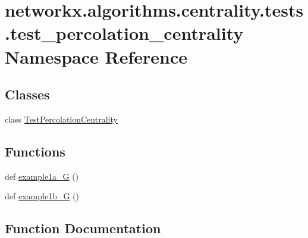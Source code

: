 \hypertarget{namespacenetworkx_1_1algorithms_1_1centrality_1_1tests_1_1test__percolation__centrality}{}\section{networkx.\+algorithms.\+centrality.\+tests.\+test\+\_\+percolation\+\_\+centrality Namespace Reference}
\label{namespacenetworkx_1_1algorithms_1_1centrality_1_1tests_1_1test__percolation__centrality}
\subsection*{Classes}
\begin{DoxyCompactItemize}
\item 
class \hyperlink{classnetworkx_1_1algorithms_1_1centrality_1_1tests_1_1test__percolation__centrality_1_1TestPercolationCentrality}{Test\+Percolation\+Centrality}
\end{DoxyCompactItemize}
\subsection*{Functions}
\begin{DoxyCompactItemize}
\item 
def \hyperlink{namespacenetworkx_1_1algorithms_1_1centrality_1_1tests_1_1test__percolation__centrality_a2f85e42a49101fa5f0e9ba6161d0e709}{example1a\+\_\+G} ()
\item 
def \hyperlink{namespacenetworkx_1_1algorithms_1_1centrality_1_1tests_1_1test__percolation__centrality_a0ac7901e082433231aa73051d488c908}{example1b\+\_\+G} ()
\end{DoxyCompactItemize}


\subsection{Function Documentation}
\mbox{\label{namespacenetworkx_1_1algorithms_1_1centrality_1_1tests_1_1test__percolation__centrality_a2f85e42a49101fa5f0e9ba6161d0e709}} 
